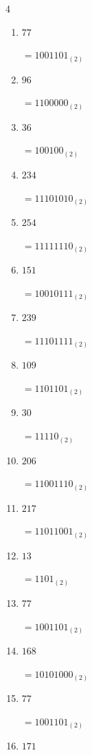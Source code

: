 \begin{multicols}{4}
\begin{enumerate}
        $=10101100_{(2)}$

  \item $77$

        $=1001101_{(2)}$

  \item $96$

        $=1100000_{(2)}$

  \item $36$

        $=100100_{(2)}$

  \item $234$

        $=11101010_{(2)}$

  \item $254$

        $=11111110_{(2)}$

  \item $151$

        $=10010111_{(2)}$

  \item $239$

        $=11101111_{(2)}$

\columnbreak %

  \item $109$

        $=1101101_{(2)}$

  \item $30$

        $=11110_{(2)}$

  \item $206$

        $=11001110_{(2)}$

  \item $217$

        $=11011001_{(2)}$

  \item $13$

        $=1101_{(2)}$

  \item $77$

        $=1001101_{(2)}$

  \item $168$

        $=10101000_{(2)}$

  \item $77$

        $=1001101_{(2)}$

  \item $171$


\end{enumerate}
\end{multicols}
